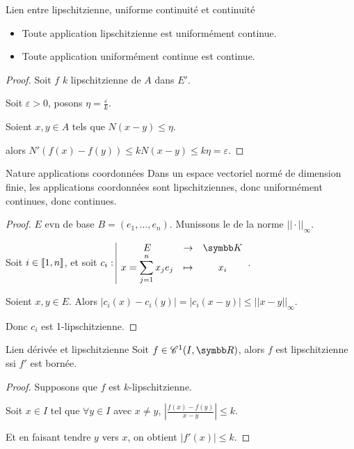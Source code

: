 \begin{proposition}{Lien entre lipschitzienne, uniforme continuité et continuité}{}
    \begin{itemize}
        \item Toute application lipschitzienne est uniformément continue. 

        \item Toute application uniformément continue est continue.
    \end{itemize}
\end{proposition}


\begin{proof}
    Soit $f$ $k$ lipschitzienne de $A$ dans $E'$.

    Soit $\varepsilon > 0$, posons $\eta = \frac \varepsilon k$.

    Soient $x, y \in A$ tels que $N(x - y) \leqslant \eta$.

    alors $N'(f(x) - f(y)) \leqslant k N(x - y) \leqslant k \eta = \varepsilon$.
\end{proof}

\begin{proposition}{Nature applications coordonnées}{}
    Dans un espace vectoriel normé de dimension finie, les applications coordonnées sont lipschitziennes, 
    donc uniformément continues, donc continues. 
\end{proposition}

\begin{proof}
    $E$ evn de base $B = (e_1, \ldots, e_n)$. Munissons le de la norme $||\cdot||_\infty$.

    Soit $i \in [\![1, n]\!]$, et soit $\fonction{c_i}{E}{\K}{x = \sum_{j=1}^n x_j e_j}{x_i}$.

    Soient $x, y \in E$. Alors $|c_i(x) - c_i(y)| = |c_i(x - y) | \leqslant ||x - y||_\infty$.

    Donc $c_i$ est 1-lipschitzienne. 
\end{proof}

\begin{theoreme}{Lien dérivée et lipschitzienne}{}
    Soit $f \in \mathscr C^1(I, \R)$, alors $f$ est lipschitzienne ssi $f'$ est bornée.
\end{theoreme}

\begin{proof}
    Supposons que $f$ est $k$-lipschitzienne. 

    Soit $x \in I$ tel que $\forall y \in I$ avec $x \neq y$, $\left|\frac{f(x) - f(y) }{x - y}\right| \leqslant k$. 

    Et en faisant tendre $y$ vers $x$, on obtient $|f'(x)| \leqslant k$.
\end{proof}

